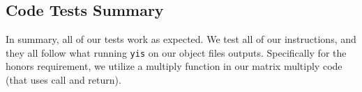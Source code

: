 \documentclass{article}
\begin{document}
\subsection{Code Tests Summary}
In summary, all of our tests work as expected. We test all of our instructions, and they all follow what running \verb+yis+ on our object files outputs. Specifically for the honors requirement, we utilize a multiply function in our matrix multiply code (that uses call and return).
\end{document}
